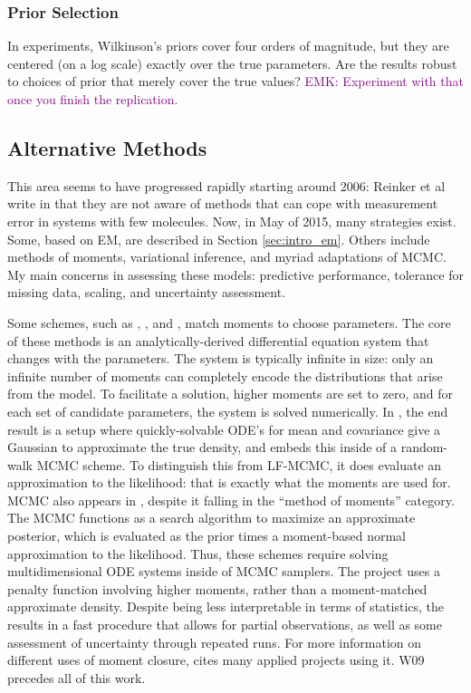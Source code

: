 \documentclass{article}
\newcommand\EMK[1]{\textcolor{purple}{EMK: #1}}
\begin{document}
\subsubsection{Prior Selection}
In experiments, Wilkinson's priors cover four orders of magnitude, but they are centered (on a log scale) exactly over the true parameters. Are the results robust to choices of prior that merely cover the true values? \EMK{Experiment with that once you finish the replication.}

\subsection{Alternative Methods}
This area seems to have progressed rapidly starting around 2006: Reinker et al write in \cite{reinker2006parameter} that they are not aware of methods that can cope with measurement error in systems with few molecules. Now, in May of 2015, many strategies exist. Some, based on EM, are described in Section \ref{sec:intro_em}. Others include methods of moments, variational inference, and myriad adaptations of MCMC. My main concerns in assessing these models: predictive performance, tolerance for missing data, scaling, and uncertainty assessment.

Some schemes, such as \cite{milner2013moment}, \cite{kugler2012moment}, and \cite{zechner2012moment}, match moments to choose parameters. The core of these methods is an analytically-derived differential equation system that changes with the parameters. The system is typically infinite in size: only an infinite number of moments can completely encode the distributions that arise from the model. To facilitate a solution, higher moments are set to zero, and for each set of candidate parameters, the system is solved numerically. In \cite{milner2013moment}, the end result is a setup where quickly-solvable ODE's for mean and covariance give a Gaussian to approximate the true density, and \cite{milner2013moment} embeds this inside of a random-walk MCMC scheme. To distinguish this from LF-MCMC, it does evaluate an approximation to the likelihood: that is exactly what the moments are used for. MCMC also appears in \cite{zechner2012moment}, despite it falling in the ``method of moments'' category. The MCMC functions as a search algorithm to maximize an approximate posterior, which is evaluated as the prior times a moment-based normal approximation to the likelihood. Thus, these schemes require solving multidimensional ODE systems inside of MCMC samplers. The project  \cite{kugler2012moment} uses a penalty function involving higher moments, rather than a moment-matched approximate density. Despite being less interpretable in terms of statistics, the results in a fast procedure that allows for partial observations, as well as some assessment of uncertainty through repeated runs. For more information on different uses of moment closure, \cite{Milner201199} cites many applied projects using it. W09 precedes all of this work. 
\end{document}
